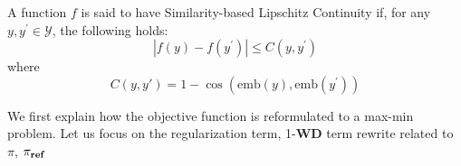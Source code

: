 \begin{definition} A function $f$ is said to have Similarity-based Lipschitz Continuity if, for any $y, y^\prime \in \mathcal{Y}$, the following holds: 
\begin{equation*}
|f(y) - f(y^\prime)| \leq C(y, y^\prime) 
\end{equation*} 
where \[ C(y, y') = 1 - \cos\left(\mathrm{emb}(y), \mathrm{emb}(y^\prime)\right) \] 
\end{definition}
We first explain how the objective function is reformulated to a max-min problem. Let us focus on the regularization term, 1-$\textbf{WD}$ term rewrite related to $\pi$, $\pi_{\textnormal{\textbf{ref}}}$

